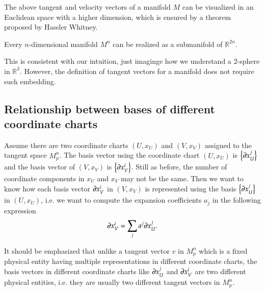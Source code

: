 \documentclass[11pt, a4paper]{book}
\begin{document}
The above tangent and velocity vectors of a manifold $M$ can be visualized in an Euclidean
space with a higher dimension, which is ensured by a theorem proposed by Hassler Whitney.
\begin{Theorem}
  Every $n$-dimensional manifold $M^n$ can be realized as a submanifold of $\mathbb{R}^{2n}$.
\end{Theorem}
This is consistent with our intuition, just imaginge how we understand a 2-sphere in
$\mathbb{R}^3$. However, the definition of tangent vectors for a manifold does not require
such embedding.

\subsection{Relationship between bases of different coordinate charts}

Assume there are two coordinate charts $(U,x_U)$ and $(V,x_V)$ assigned to the tangent
space $M_p^n$. The basis vector using the coordinate chart $(U,x_U)$ is
$\left\{ \boldsymbol{\partial}x_U^j \right\}$ and the basis vector of $(V,x_V)$ is
$\left\{ \boldsymbol{\partial}x_V^i \right\}$. Still as before, the number of coordinate
components in $x_U$ and $x_V$ may not be the same. Then we want to know how each basis
vector $\boldsymbol{\partial}x_V^i$ in $(V,x_V)$ is represented using the basis
$\left\{ \boldsymbol{\partial}x_U^j \right\}$ in $(U,x_U)$, i.e. we want to compute the expansion
coefficients $a_j$ in the following expression
\begin{equation*}
  \boldsymbol{\partial}x_V^i = \sum_j a^j \boldsymbol{\partial}x_U^j.
\end{equation*}
\begin{Remark}
  It should be emphasized that unlike a tangent vector $v$ in $M_p^n$ which is a fixed physical
  entity having multiple representations in different coordinate charts, the basis vectors
  in different coordinate charts like $\boldsymbol{\partial}x_U^j$ and $\boldsymbol{\partial}x_V^i$ are
  two different physical entities, i.e. they are usually two different tangent vectors in
  $M_p^n$.
\end{Remark}
\end{document}

